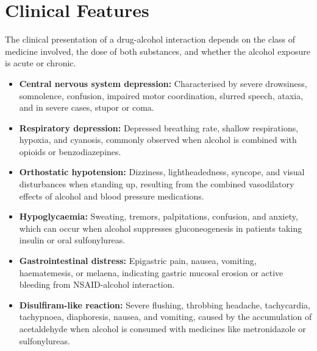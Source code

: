 \section*{Clinical Features}
The clinical presentation of a drug-alcohol interaction depends on the class of medicine involved, the dose of both substances, and whether the alcohol exposure is acute or chronic.
\begin{itemize}
    \item \textbf{Central nervous system depression:} Characterised by severe drowsiness, somnolence, confusion, impaired motor coordination, slurred speech, ataxia, and in severe cases, stupor or coma.
    \item \textbf{Respiratory depression:} Depressed breathing rate, shallow respirations, hypoxia, and cyanosis, commonly observed when alcohol is combined with opioids or benzodiazepines.
    \item \textbf{Orthostatic hypotension:} Dizziness, lightheadedness, syncope, and visual disturbances when standing up, resulting from the combined vasodilatory effects of alcohol and blood pressure medications.
    \item \textbf{Hypoglycaemia:} Sweating, tremors, palpitations, confusion, and anxiety, which can occur when alcohol suppresses gluconeogenesis in patients taking insulin or oral sulfonylureas.
    \item \textbf{Gastrointestinal distress:} Epigastric pain, nausea, vomiting, haematemesis, or melaena, indicating gastric mucosal erosion or active bleeding from NSAID-alcohol interaction.
    \item \textbf{Disulfiram-like reaction:} Severe flushing, throbbing headache, tachycardia, tachypnoea, diaphoresis, nausea, and vomiting, caused by the accumulation of acetaldehyde when alcohol is consumed with medicines like metronidazole or sulfonylureas.
\end{itemize}

